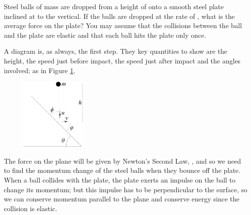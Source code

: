 
\begin{problem}[HSC1946P1X1a] %
{%
Steel balls of mass  are dropped from a height of  onto a smooth steel plate inclined at   to the vertical.  If the balls are dropped at the rate of , what is the average force on the plate? You may assume that the collisions between the ball and the plate are elastic and that each ball hits the plate only once.
}{
}{ %
A diagram is, as always, the first step. They key quantities to show are the height, the speed just before impact, the speed just after impact and the angles involved; as in Figure \ref{fig:Dynamics_ball_plane_p}.

\begin{figure}[h]
	\centering
	\includegraphics[width=0.3\textwidth]{../../../figures/Dynamics_ball_plane_p.svg}
	\caption{}
	\label{fig:Dynamics_ball_plane_p}
\end{figure}

The force on the plane will be given by Newton's Second Law, , and so we need to find the momentum change of the steel balls when they bounce off the plate. When a ball collides with the plate, the plate exerts an impulse on the ball to change its momentum; but this impulse has to be perpendicular to the surface, so we can conserve momentum parallel to the plane and conserve energy since the collision is elastic.

}
\end{problem}
